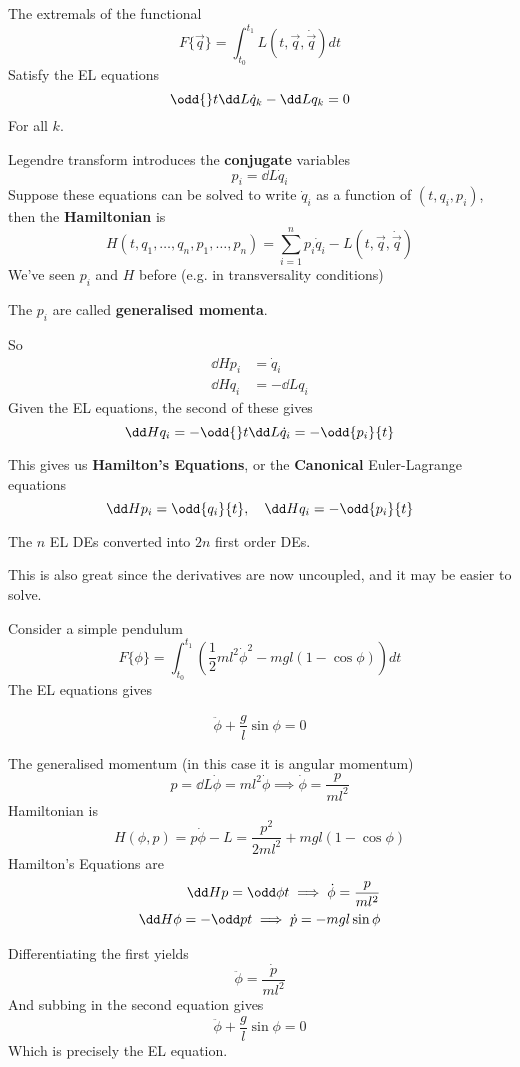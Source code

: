 \documentclass{E:/Documents/Latex/myassignment}
\begin{document}
The extremals of the functional
\[F\{\vec q\} = \int_{t_0}^{t_1} L(t,\vec q,\dot{\vec q}) dt\]
Satisfy the EL equations
\[\odd{}t \dd L{\dot q_k} - \dd L{q_k} = 0\]
For all $k$.



Legendre transform introduces the \textbf{conjugate} variables
\[p_i = \dd L{\dot q_i}\]
Suppose these equations can be solved to write $\dot q_i$ as a function of $(t,q_i,p_i)$, then the \textbf{Hamiltonian} is
\[H(t,q_1,\ldots,q_n,p_1,\ldots,p_n) = \sum_{i=1}^n p_i \dot q_i - L(t,\vec q,\dot{\vec q})\]
We've seen $p_i$ and $H$ before (e.g. in transversality conditions)

The $p_i$ are called \textbf{generalised momenta}. 


So
\begin{align*}
	\dd H{p_i} &= \dot q_i\\
	\dd H{q_i} &= - \dd L{q_i}
\end{align*}
Given the EL equations, the second of these gives
\[\dd H{q_i} = - \odd{}t \dd L{\dot q_i} = - \odd{p_i}{t}\]



This gives us \textbf{Hamilton's Equations}, or the \textbf{Canonical} Euler-Lagrange equations
\[\dd H{p_i} = \odd{q_i}{t}, \quad \dd H{q_i} = - \odd{p_i}{t}\]

The $n$ EL DEs converted into $2n$ first order DEs.

This is also great since the derivatives are now uncoupled, and it may be easier to solve.


Consider a simple pendulum
\[F\{\phi\} = \int_{t_0}^{t_1} \left(\frac12 m l^2 \dot \phi^2 - m g l ( 1 - \cos\phi )\right) dt\]
The EL equations gives

\[\ddot \phi + \frac{g}{l}\sin\phi = 0\]

The generalised momentum (in this case it is angular momentum)
\[p = \dd L{\dot\phi} = m l^2 \dot \phi \implies \dot\phi = \frac{p}{ml^2}\]
Hamiltonian is
\[H(\phi,p) = p\dot\phi - L = \frac{p^2}{2m l ^2} + mgl (1 - \cos\phi)\]
Hamilton's Equations are
\begin{align*}
	\dd Hp = \odd \phi t \implies \dot\phi = \frac{p}{ml^2}\\
	\dd H\phi = - \odd pt \implies \dot p = - mgl\sin\phi 
\end{align*}

Differentiating the first yields
\[\ddot \phi = \frac{\dot p}{ml^2}\]
And subbing in the second equation gives
\[\ddot \phi + \frac{g}{l} \sin\phi = 0\]
Which is precisely the EL equation.
\end{document}
